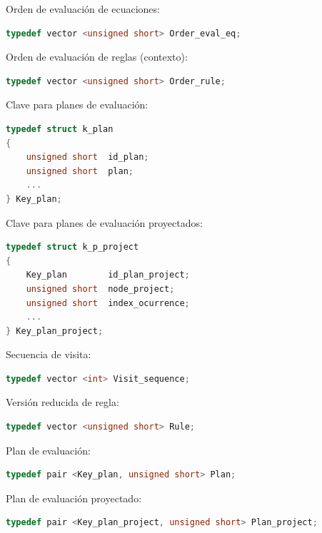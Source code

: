 \begin{items}
\item Orden de evaluación de ecuaciones:
\begin{lstlisting}[basicstyle=\scriptsize, backgroundcolor=\color{white}, language=c++, columns=fullflexible, linewidth=7.5cm]
typedef vector <unsigned short> Order_eval_eq;
\end{lstlisting}

\item Orden de evaluación de reglas (contexto):
\begin{lstlisting}[basicstyle=\scriptsize, backgroundcolor=\color{white}, language=c++, columns=fullflexible, linewidth=7cm]
typedef vector <unsigned short> Order_rule;
\end{lstlisting}

\item Clave para planes de evaluación:
\begin{lstlisting}[basicstyle=\scriptsize, backgroundcolor=\color{white}, language=c++, columns=fullflexible, linewidth=4.5cm]
typedef struct k_plan
{
    unsigned short  id_plan;
    unsigned short  plan;
    ...
} Key_plan;
\end{lstlisting}

\item Clave para planes de evaluación proyectados:
\begin{lstlisting}[basicstyle=\scriptsize, backgroundcolor=\color{white}, language=c++, columns=fullflexible, linewidth=6cm]
typedef struct k_p_project
{
    Key_plan        id_plan_project;
    unsigned short  node_project;
    unsigned short  index_ocurrence;
    ...
} Key_plan_project;
\end{lstlisting}

\item Secuencia de visita:
\begin{lstlisting}[basicstyle=\scriptsize, backgroundcolor=\color{white}, language=c++, columns=fullflexible, linewidth=6cm]
typedef vector <int> Visit_sequence;
\end{lstlisting}

\item Versión reducida de regla:
\begin{lstlisting}[basicstyle=\scriptsize, backgroundcolor=\color{white}, language=c++, columns=fullflexible, linewidth=6cm]
typedef vector <unsigned short> Rule;
\end{lstlisting}

\item Plan de evaluación:
\begin{lstlisting}[basicstyle=\scriptsize, backgroundcolor=\color{white}, language=c++, columns=fullflexible, linewidth=7.5cm]
typedef pair <Key_plan, unsigned short> Plan;
\end{lstlisting}

\item Plan de evaluación proyectado:
\begin{lstlisting}[basicstyle=\scriptsize, backgroundcolor=\color{white}, language=c++, columns=fullflexible, linewidth=10cm]
typedef pair <Key_plan_project, unsigned short> Plan_project;
\end{lstlisting}
\end{items}

\normalsize
